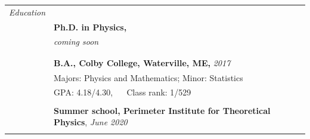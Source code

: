 \documentclass[10pt]{article}
\begin{document}
\noindent \begin{longtable}{ l p{15cm}   }

	
  \large{\textit{Education}}    	& \\ 
  						& \textbf{Ph.D. in Physics,} \\
  						& \textit{coming soon}\\
  						& \\ \vspace{-12pt}
  
  
  						& \\ 
  						& \textbf{B.A., Colby College, Waterville, ME,} \textit{2017\textendash 2021} \\
     				 	& Majors: Physics and Mathematics; Minor: Statistics  \\
     					& GPA: 4.18/4.30, $\quad$ Class rank: 1/529 \\
	 					& \\ 

	 					
	 					
	 					
	 					&\textbf{Summer school, Perimeter Institute for Theoretical Physics}, \textit{June 2020} \\
						&\\
						

\end{longtable}
\end{document}
